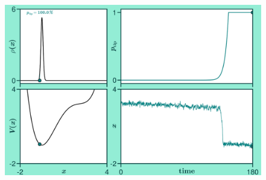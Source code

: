\documentclass[./main.tex]{subfiles}
\begin{document}
\begin{frame}[label=slide09]
\begin{columns}
                \begin{figure}
                    \centering
                    \includegraphics[keepaspectratio, width=\textwidth]{./figures/figure.png}
                \end{figure}
        \end{columns}
\end{frame}
\end{document}
